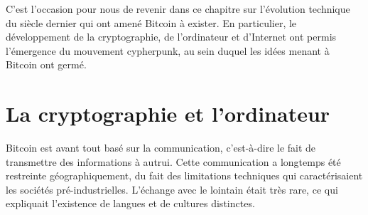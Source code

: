 C'est l'occasion pour nous de revenir dans ce chapitre sur l'évolution technique du siècle dernier qui ont amené Bitcoin à exister. En particulier, le développement de la cryptographie, de l'ordinateur et d'Internet ont permis l'émergence du mouvement cypherpunk, au sein duquel les idées menant à Bitcoin ont germé.

%


\section*{La cryptographie et l'ordinateur}


Bitcoin est avant tout basé sur la communication, c'est-à-dire le fait de transmettre des informations à autrui. Cette communication a longtemps été restreinte géographiquement, du fait des limitations techniques qui caractérisaient les sociétés pré-industrielles. L'échange avec le lointain était très rare, ce qui expliquait l'existence de langues et de cultures distinctes.

